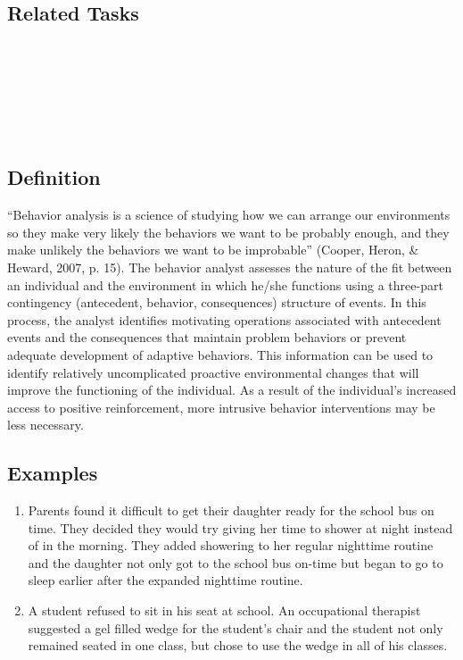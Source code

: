 \subsection{Related Tasks}
\fourbTwo{}\\
\fourgTwo{}\\
\fourgSix{}\\
\fourkEight{}\\
\fourkNine{}\\
%
%
%
%
%
%
\section[\fourgEight{}]{\fourgEight{}%
              }
\subsection{Definition}
``Behavior analysis is a science of studying how we can arrange our environments so they make very likely the behaviors we want to be probably enough, and they make unlikely the behaviors we want to be improbable'' (Cooper, Heron, \& Heward, 2007, p. 15). The behavior analyst assesses the nature of the fit between an individual and the environment in which he/she functions using a three-part contingency (antecedent, behavior, consequences) structure of events. In this process, the analyst identifies motivating operations associated with antecedent events and the consequences that maintain problem behaviors or prevent adequate development of adaptive behaviors. This information can be used to identify relatively uncomplicated proactive environmental changes that will improve the functioning of the individual. As a result of the individual's increased access to positive reinforcement, more intrusive behavior interventions may be less necessary. 
%
\subsection{Examples}
\begin{enumerate}
\item Parents found it difficult to get their daughter ready for the school bus on time. They decided they would try giving her time to shower at night instead of in the morning. They added showering to her regular nighttime routine and the daughter not only got to the school bus on-time but began to go to sleep earlier after the expanded nighttime routine.
\item A student refused to sit in his seat at school. An occupational therapist suggested a gel filled wedge for the student's chair and the student not only remained seated in one class, but chose to use the wedge in all of his classes.
\end{enumerate}
%
